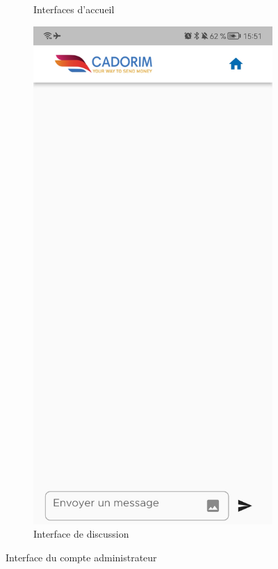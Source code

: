 \begin{itemize}[label=$\ast$]
\begin{figure}
\begin{subfigure}{0.3\textwidth}
	\caption{Interfaces d’accueil}
	\label{klk}
\end{subfigure}
\begin{subfigure}{0.3\textwidth}
	\includegraphics[width=\hsize, valign=m ]{./Template LaTeX/Images/20.jpg}
	\caption{Interface de discussion}
	\label{klk}
\end{subfigure}
	\caption{Interface du compte administrateur
}
\label{serviceCl}
\end{figure}
\end{itemize}


